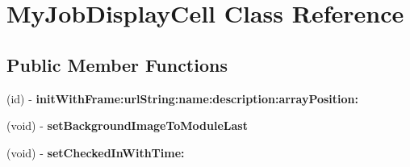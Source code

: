 \hypertarget{interface_my_job_display_cell}{
\section{\-My\-Job\-Display\-Cell \-Class \-Reference}
\label{interface_my_job_display_cell}
}
\subsection*{\-Public \-Member \-Functions}
\begin{DoxyCompactItemize}
\item 
\hypertarget{interface_my_job_display_cell_ad1ce1cee3842b62ddf597b47797394bf}{
(id) -\/ {\bfseries init\-With\-Frame\-:url\-String\-:name\-:description\-:array\-Position\-:}}
\label{interface_my_job_display_cell_ad1ce1cee3842b62ddf597b47797394bf}

\item 
\hypertarget{interface_my_job_display_cell_a839e8cc5b4a2951dcb2ea4fb2419cf54}{
(void) -\/ {\bfseries set\-Background\-Image\-To\-Module\-Last}}
\label{interface_my_job_display_cell_a839e8cc5b4a2951dcb2ea4fb2419cf54}

\item 
\hypertarget{interface_my_job_display_cell_ad9cbe2d1b05de57be61b29a43ee5afe2}{
(void) -\/ {\bfseries set\-Checked\-In\-With\-Time\-:}}
\label{interface_my_job_display_cell_ad9cbe2d1b05de57be61b29a43ee5afe2}

\end{DoxyCompactItemize}
